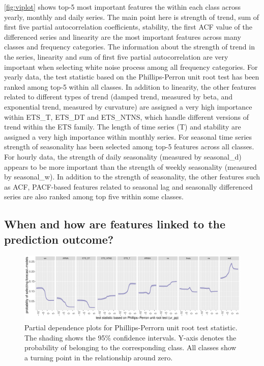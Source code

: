 \documentclass[11pt,a4paper,]{article}
\begin{document}
\autoref{fig:viplot} shows top-5 most important features the within each class across yearly, monthly and daily series. The main point here is strength of trend, sum of first five partial autocorrelation coefficients, stability, the first ACF value of the differenced series and linearity are the most important features across many classes and frequency categories. The information about the strength of trend in the series, linearity and sum of first five partial autocorrelation are very important when selecting white noise process among all frequency categories. For yearly data, the test statistic based on the Phillips-Perron unit root test has been ranked among top-5 within all classes. In addition to linearity, the other features related to different types of trend (damped trend, measured by beta, and exponential trend, measured by curvature) are assigned a very high importance within ETS\_T, ETS\_DT and ETS\_NTNS, which handle different versions of trend within the ETS family. The length of time series (T) and stability are assigned a very high importance within monthly series. For seasonal time series strength of seasonality has been selected among top-5 features across all classes. For hourly data, the strength of daily seasonality (measured by seasonal\_d) appears to be more important than the strength of weekly seasonality (measured by seasonal\_w). In addition to the strength of seasonality, the other features such as ACF, PACF-based features related to seasonal lag and seasonally differenced series are also ranked among top five within some classes.

\hypertarget{when-and-how-are-features-linked-to-the-prediction-outcome}{%
\subsection{When and how are features linked to the prediction outcome?}\label{when-and-how-are-features-linked-to-the-prediction-outcome}}

\begin{figure}[h]

{\centering \includegraphics[width=\textwidth]{figure/pdpyearlyurpp-1} 

}

\caption{Partial dependence plots for Phillips-Perrorn unit root test statistic. The shading shows the 95\% confidence intervals. Y-axis denotes the probability of belonging to the corresponding class. All classes show a turning point in the relationship around zero.}\label{fig:pdpyearlyurpp}
\end{figure}
\end{document}
